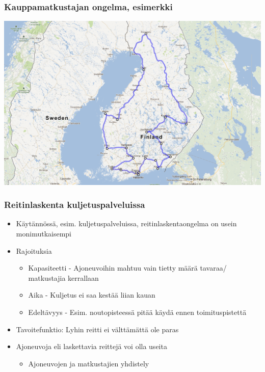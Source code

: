 \documentclass{beamer}
\begin{document}
        \begin{frame}
  \frametitle{Kauppamatkustajan ongelma, esimerkki}   %
\centering
\includegraphics[scale=0.25]{tspdemo02}
    \end{frame}
    

\begin{frame}
    \frametitle{Reitinlaskenta kuljetuspalveluissa}
    \begin{itemize}
    \item
    Käytännössä, esim. kuljetuspalveluissa, reitinlaskentaongelma on usein monimutkaisempi
    \item
    Rajoituksia
    \begin{itemize}
\item 
Kapasiteetti - Ajoneuvoihin mahtuu vain tietty määrä tavaraa/ matkustajia kerrallaan
\item
Aika - Kuljetus ei saa kestää liian kauan
\item
Edeltävyys - Esim. noutopisteessä pitää käydä ennen toimituspistettä
\end{itemize}
\item
Tavoitefunktio: Lyhin reitti ei välttämättä ole paras
\item
Ajoneuvoja eli laskettavia reittejä voi olla useita
\begin{itemize}
 \item 
 Ajoneuvojen ja matkustajien yhdistely
\end{itemize}
  \end{itemize}

\end{frame}
\end{document}
